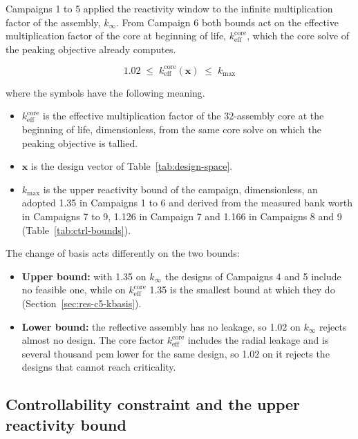 Campaigns 1 to 5 applied the reactivity window to the infinite
multiplication factor of the assembly, $k_\infty$. From Campaign 6 both
bounds act on the effective multiplication factor of the core at
beginning of life, $k_\mathrm{eff}^\mathrm{core}$, which the core solve of the
peaking objective already computes.

\begin{equation}
1.02 \;\le\; k_\mathrm{eff}^\mathrm{core}(\mathbf{x}) \;\le\; k_{\max}
\label{eq:k-window-core}
\end{equation}

\noindent where the symbols have the following meaning.

\begin{itemize}
  \item $k_\mathrm{eff}^\mathrm{core}$ is the effective multiplication
        factor of the 32-assembly core at the beginning of life,
        dimensionless, from the same core solve on which the peaking
        objective is tallied.

  \item $\mathbf{x}$ is the design vector of
        Table~\ref{tab:design-space}.

  \item $k_{\max}$ is the upper reactivity bound of the campaign,
        dimensionless, an adopted 1.35 in Campaigns 1 to 6 and derived
        from the measured bank worth in Campaigns 7 to 9, 1.126 in
        Campaign 7 and 1.166 in Campaigns 8 and 9
        (Table~\ref{tab:ctrl-bounds}).
\end{itemize}

The change of basis acts differently on the two bounds:

\begin{itemize}
  \item \textbf{Upper bound:} with 1.35 on $k_\infty$ the designs of
        Campaigns 4 and 5 include no feasible one, while on
        $k_\mathrm{eff}^\mathrm{core}$ 1.35 is the smallest bound at which
        they do (Section~\ref{sec:res-c5-kbasis}).
  \item \textbf{Lower bound:} the reflective assembly has no leakage, so
        1.02 on $k_\infty$ rejects almost no design. The core factor
        $k_\mathrm{eff}^\mathrm{core}$ includes the radial leakage and is
        several thousand pcm lower for the same design, so 1.02 on it
        rejects the designs that cannot reach criticality.
\end{itemize}

\subsection{Controllability constraint and the upper reactivity bound}
\label{sec:meth-ctrl}


